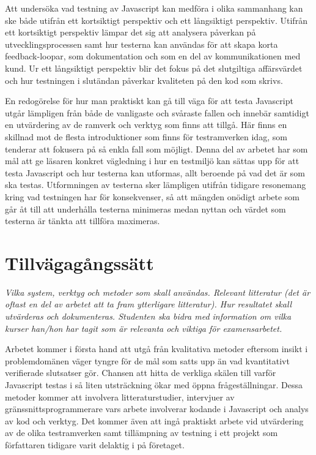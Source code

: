 \documentclass[11pt]{article}
\begin{document}
Att undersöka vad testning av Javascript kan medföra i olika sammanhang kan ske både utifrån ett kortsiktigt perspektiv och ett långsiktigt perspektiv. Utifrån ett kortsiktigt perspektiv lämpar det sig att analysera påverkan på utvecklingsprocessen samt hur testerna kan användas för att skapa korta feedback-loopar, som dokumentation och som en del av kommunikationen med kund. Ur ett långsiktigt perspektiv blir det fokus på det slutgiltiga affärsvärdet och hur testningen i slutändan påverkar kvaliteten på den kod som skrivs.

En redogörelse för hur man praktiskt kan gå till väga för att testa Javascript utgår lämpligen från både de vanligaste och svåraste fallen och innebär samtidigt en utvärdering av de ramverk och verktyg som finns att tillgå. Här finns en skillnad mot de flesta introduktioner som finns för testramverken idag, som tenderar att fokusera på så enkla fall som möjligt. Denna del av arbetet har som mål att ge läsaren konkret vägledning i hur en testmiljö kan sättas upp för att testa Javascript och hur testerna kan utformas, allt beroende på vad det är som ska testas. Utformningen av testerna sker lämpligen utifrån tidigare resonemang kring vad testningen har för konsekvenser, så att mängden onödigt arbete som går åt till att underhålla testerna minimeras medan nyttan och värdet som testerna är tänkta att tillföra maximeras.

\section{Tillvägagångssätt}

\textit{Vilka system, verktyg och metoder som skall användas. Relevant litteratur (det är oftast en del av arbetet att ta fram ytterligare litteratur). Hur resultatet skall utvärderas och dokumenteras. Studenten ska bidra med information om vilka kurser han/hon har tagit som är relevanta och viktiga för examensarbetet.}

Arbetet kommer i första hand att utgå från kvalitativa metoder eftersom insikt i problemdomänen väger tyngre för de mål som satts upp än vad kvantitativt verifierade slutsatser gör. Chansen att hitta de verkliga skälen till varför Javascript testas i så liten utsträckning ökar med öppna frågeställningar. Dessa metoder kommer att involvera litteraturstudier, intervjuer av gränssnittsprogrammerare vars arbete involverar kodande i Javascript och analys av kod och verktyg. Det kommer även att ingå praktiskt arbete vid utvärdering av de olika testramverken samt tillämpning av testning i ett projekt som författaren tidigare varit delaktig i på företaget.
\end{document}
